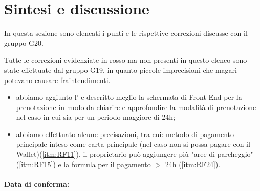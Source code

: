 \section{Sintesi e discussione}
In questa sezione sono elencati i punti e le rispettive correzioni discusse con il gruppo G20. 

Tutte le correzioni evidenziate in rosso ma non presenti in questo elenco sono state effettuate dal gruppo G19, in quanto piccole imprecisioni che magari potevano causare fraintendimenti.
\begin{itemize}
    \item abbiamo aggiunto l'\textbf{} e descritto meglio la schermata di Front-End per la prenotazione in modo da chiarire e approfondire la modalità di prenotazione nel caso in cui sia per un periodo maggiore di 24h;
    \item abbiamo effettuato alcune precisazioni, tra cui: metodo di pagamento principale inteso come carta principale (nel caso non si possa pagare con il Wallet)(\ref{itm:RF11}), il proprietario può aggiungere più "aree di parcheggio" (\ref{itm:RF15}) e la formula per il pagamento $>$ 24h (\ref{itm:RF24}).
\end{itemize}

\paragraph{Data di conferma:}